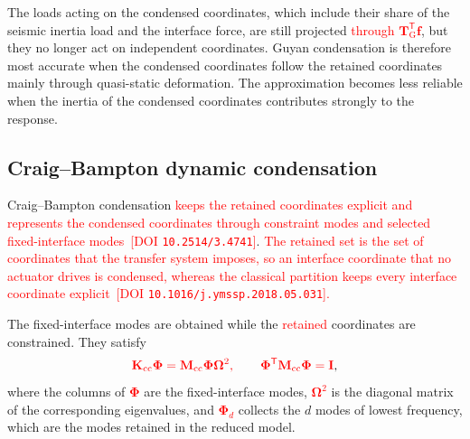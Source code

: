 \documentclass[11pt,a4paper]{article}
\numberwithin{equation}{section}
\newcommand{\rev}[1]{\textcolor{red}{#1}}
\begin{document}
The loads acting on the condensed coordinates, which include their share of the seismic inertia load and the interface force, are still projected \rev{through \(\mathbf{T}_{\mathrm{G}}^{\mathsf{T}}\bm{f}\)}, but they no longer act on independent coordinates. Guyan condensation is therefore most accurate when the condensed coordinates follow the retained coordinates mainly through quasi-static deformation. The approximation becomes less reliable when the inertia of the condensed coordinates contributes strongly to the response.

\subsection{Craig--Bampton dynamic condensation}
\label{sec:cb-condensation}

Craig--Bampton condensation \rev{keeps the retained coordinates explicit and represents the condensed coordinates through constraint modes and selected fixed-interface modes} \cite{CraigBampton1968}\,\rev{[DOI \nolinkurl{10.2514/3.4741}]}. \rev{The retained set is the set of coordinates that the transfer system imposes, so an interface coordinate that no actuator drives is condensed, whereas the classical partition keeps every interface coordinate explicit \cite{Krattiger2019}\,[DOI \nolinkurl{10.1016/j.ymssp.2018.05.031}].}

The fixed-interface modes are obtained while the \rev{retained} coordinates are constrained. They satisfy
\begin{equation}
	\rev{\mathbf{K}_{\mathrm{cc}}\bm{\Phi}
		=\mathbf{M}_{\mathrm{cc}}\bm{\Phi}\bm{\Omega}^{2},
		\qquad
		\bm{\Phi}^{\mathsf{T}}\mathbf{M}_{\mathrm{cc}}\bm{\Phi}=\mathbf{I}},
	\label{eq:fixed-interface-modes}
\end{equation}
where the columns of \rev{\(\bm{\Phi}\)} are the fixed-interface modes, \rev{\(\bm{\Omega}^{2}\)} is the diagonal matrix of the corresponding eigenvalues, and \rev{\(\bm{\Phi}_{d}\)} collects the \(d\) modes of lowest frequency, which are the modes retained in the reduced model.
\end{document}
